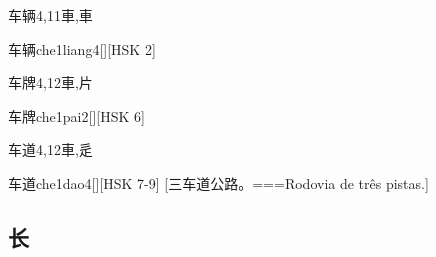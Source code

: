 \begin{Entry}{车辆}{4,11}{⾞,⾞}
  \begin{Phonetics}{车辆}{che1liang4}[][HSK 2]
  \end{Phonetics}
\end{Entry}

\begin{Entry}{车牌}{4,12}{⾞,⽚}
  \begin{Phonetics}{车牌}{che1pai2}[][HSK 6]
  \end{Phonetics}
\end{Entry}

\begin{Entry}{车道}{4,12}{⾞,⾡}
  \begin{Phonetics}{车道}{che1dao4}[][HSK 7-9]
    [三车道公路。===Rodovia de três pistas.]
  \end{Phonetics}
\end{Entry}

\subsection*{长}

